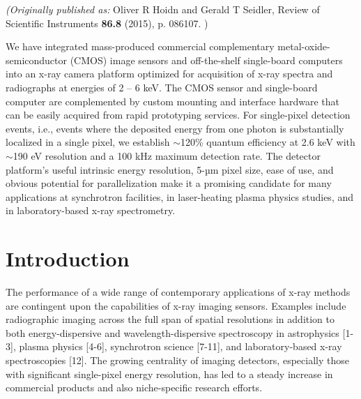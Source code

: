 \emph{(Originally published as: }
Oliver R Hoidn and Gerald T Seidler, Review of Scientific Instruments {\bfseries 86.8}
(2015), p. 086107.
)

\begin{addmargin}[4em]{1em}
We have integrated mass-produced commercial complementary
metal-oxide-semiconductor (CMOS) image sensors and off-the-shelf
single-board computers into an x-ray camera platform optimized for
acquisition of x-ray spectra and radiographs at energies of 2 -- 6 keV.
The CMOS sensor and single-board computer are complemented by custom
mounting and interface hardware that can be easily acquired from rapid
prototyping services. For single-pixel detection events, i.e., events
where the deposited energy from one photon is substantially localized in
a single pixel, we establish $\sim$120\% quantum efficiency at
2.6 keV with $\sim$190 eV resolution and a 100 kHz maximum
detection rate. The detector platform's useful intrinsic energy
resolution, 5-µm pixel size, ease of use, and obvious potential for parallelization make
it a promising candidate for many applications at synchrotron
facilities, in laser-heating plasma physics studies, and in
laboratory-based x-ray spectrometry.
\end{addmargin}


\section{Introduction}
The performance of a wide range of contemporary applications of x-ray
methods are contingent upon the capabilities of x-ray imaging sensors.
Examples include radiographic imaging across the full span of spatial
resolutions in addition to both energy-dispersive and
wavelength-dispersive spectroscopy in
astrophysics {[}1-3{]}, plasma
physics {[}4-6{]}, synchrotron
science {[}7-11{]}, and
laboratory-based x-ray
spectroscopies {[}12{]}. The
growing centrality of imaging detectors, especially those with
significant single-pixel energy resolution, has led to a steady increase
in commercial products and also niche-specific research efforts.

